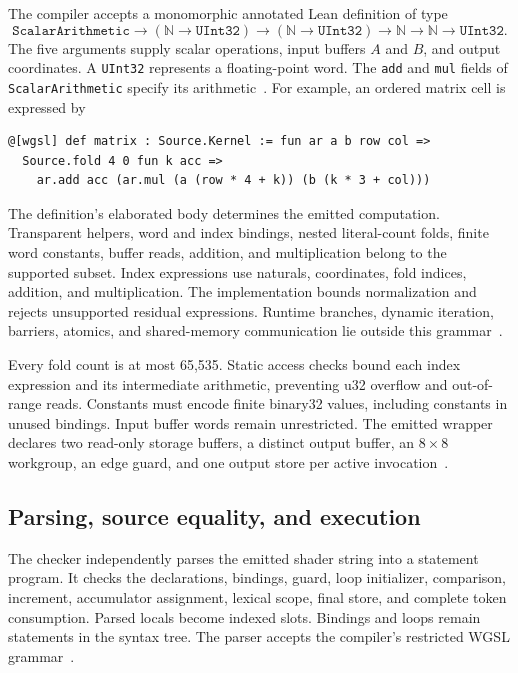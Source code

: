 \documentclass[11pt]{article}
\newcommand{\code}[1]{\texttt{#1}}
\begin{document}
The compiler accepts a monomorphic annotated Lean definition of type
\[
\code{ScalarArithmetic}\to(\mathbb N\to\code{UInt32})\to
(\mathbb N\to\code{UInt32})\to\mathbb N\to\mathbb N\to\code{UInt32}.
\]
The five arguments supply scalar operations, input buffers $A$ and $B$, and output coordinates.  A \code{UInt32} represents a floating-point word.  The \code{add} and \code{mul} fields of \code{ScalarArithmetic} specify its arithmetic~\cite{compiler}.  For example, an ordered matrix cell is expressed by
\begin{verbatim}
@[wgsl] def matrix : Source.Kernel := fun ar a b row col =>
  Source.fold 4 0 fun k acc =>
    ar.add acc (ar.mul (a (row * 4 + k)) (b (k * 3 + col)))
\end{verbatim}
The definition's elaborated body determines the emitted computation.  Transparent helpers, word and index bindings, nested literal-count folds, finite word constants, buffer reads, addition, and multiplication belong to the supported subset.  Index expressions use naturals, coordinates, fold indices, addition, and multiplication.  The implementation bounds normalization and rejects unsupported residual expressions.  Runtime branches, dynamic iteration, barriers, atomics, and shared-memory communication lie outside this grammar~\cite{compiler}.

Every fold count is at most 65,535.  Static access checks bound each index expression and its intermediate arithmetic, preventing u32 overflow and out-of-range reads.  Constants must encode finite binary32 values, including constants in unused bindings.  Input buffer words remain unrestricted.  The emitted wrapper declares two read-only storage buffers, a distinct output buffer, an $8\times8$ workgroup, an edge guard, and one output store per active invocation~\cite{compiler,execution}.

\subsection{Parsing, source equality, and execution}

The checker independently parses the emitted shader string into a statement program.  It checks the declarations, bindings, guard, loop initializer, comparison, increment, accumulator assignment, lexical scope, final store, and complete token consumption.  Parsed locals become indexed slots.  Bindings and loops remain statements in the syntax tree.  The parser accepts the compiler's restricted WGSL grammar~\cite{compiler}.
\end{document}
